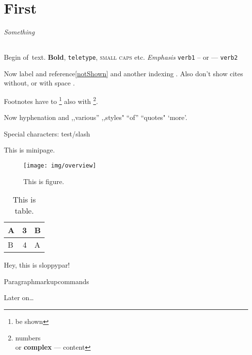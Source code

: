 \documentclass[draft]{book}
\begin{document}
\tableofcontents
\setcounter{page}{2142}

\chapter*{First}

\subparagraph*{Something}

Begin of~text. \textbf{Bold}, \texttt{teletype}, \textsc{small caps} etc.
\emph{Emphasis} \verb+verb1+ -- or --- \verb!verb2!

Now label\label{notShown} and reference\ref{notShown} and
another\pageref{notShown} indexing . Also don't show
cites without\cite{notShown}, or with space \cite{notShown}.

Footnotes have to \footnote{be shown} also with \footnote[0]{numbers\\or
\textbf{complex} --- content}.

Now hy\-phe\-na\-tion and ,,various'' ,,styles" ``of'' ``quotes" `more'.

Special characters: test\slash{}slash

\begin{minipage}[t]{0.5\textwidth}
This is minipage.
\end{minipage}

\begin{figure}[htp]
	\centering
	\texttt{[image: img/overview]}
	\caption{This is figure.}
\end{figure}

\begin{table}[H]
\begin{tabular}{|l|r|l|}
\hline
A & 3 & B \\ \hline
B & 4 & A \\ \hline
\end{tabular}
\caption{This is table.}
\end{table}

\begin{sloppypar}
Hey, this is sloppypar!
\end{sloppypar}

Paragraph\linebreak[3]markup\linebreak{}commands

Later on\ldots

\cleardoublepage
{}
{}
\printindex
\end{document}
